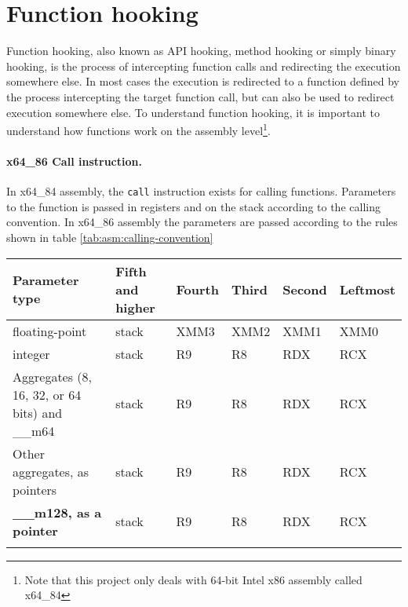 \documentclass{report}
\begin{document}
\section{Function hooking}
\label{sec:hooking}
Function hooking, also known as API hooking, method hooking or simply binary hooking, is the process of intercepting function calls and redirecting the execution somewhere else. In most cases the execution is redirected to a function defined by the process intercepting the target function call, but can also be used to redirect execution somewhere else. To understand function hooking, it is important to understand how functions work on the assembly level\footnote{Note that this project only deals with 64-bit Intel x86 assembly called x64\_84}.

\paragraph{x64\_86 Call instruction.} In x64\_84 assembly, the \texttt{call} instruction exists for calling functions\cite{url:hooking:asm:call}. Parameters to the function is passed in registers and on the stack according to the calling convention\cite{url:hooking:asm:calling-convention:x64}. In x64\_86 assembly the parameters are passed according to the rules shown in table \ref{tab:asm:calling-convention}
{
    \setlength{}%
\begin{tabularx}{1.5\textwidth}{llllll}
\textbf{Parameter type}    & \textbf{Fifth and higher} & \textbf{Fourth} & \textbf{Third} & \textbf{Second} & \textbf{Leftmost} \\ \hline
floating-point                                   & stack                                         & XMM3                                & XMM2                               & XMM1                                & XMM0                                  \\
integer                                          & stack                                         & R9                                  & R8                                 & RDX                                 & RCX                                   \\
Aggregates (8, 16, 32, or 64 bits) and \_\_m64 & stack                                         & R9                                  & R8                                 & RDX                                 & RCX                                   \\
Other aggregates, as pointers                  & stack                                         & R9                                  & R8                                 & RDX                                 & RCX                                   \\
\textbf{\_\_m128, as a pointer}                  & stack                                         & R9                                  & R8                                 & RDX                                 & RCX                                  \\
\caption{x64\_86 calling convention in Windows\cite{url:hooking:asm:calling-convention:x64}}
\label{tab:asm:calling-convention}
\end{tabularx}
}
\end{document}
